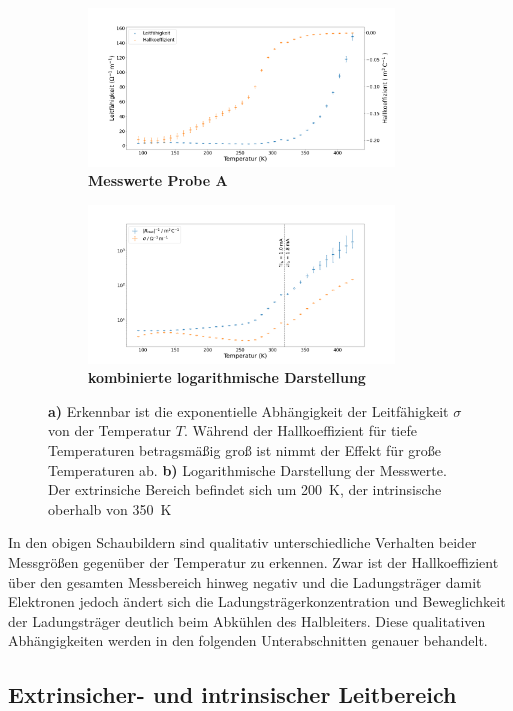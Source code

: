 \begin{figure}[H]
	\centering
	\begin{subfigure}[h]{0.45\linewidth}
	\includegraphics[height=4.2cm]{./fig/probe_A_measurement.png}
	\caption{\textbf{Messwerte Probe A}\label{fig:measurement_A}}
	\end{subfigure}
	\hfill
	\begin{subfigure}[h]{0.45\linewidth}
	\includegraphics[height=4.2cm]{./fig/probe_A_combined_plot.png}
	\caption{\textbf{kombinierte logarithmische Darstellung}
\label{fig:logarithmic_A}}
	\end{subfigure}
	\caption*{\textbf{a)} Erkennbar ist die exponentielle Abhängigkeit der 
Leitfähigkeit $\sigma$ von der Temperatur $T$. Während der Hallkoeffizient für tiefe
Temperaturen betragsmäßig groß ist nimmt der Effekt für große Temperaturen ab. 
\textbf{b)} Logarithmische Darstellung der Messwerte. Der extrinsiche Bereich 
befindet sich um \SI{200}{\kelvin}, der intrinsische oberhalb von \SI{350}{\kelvin} 
\label{measurements_A}}
\end{figure}

In den obigen Schaubildern sind qualitativ unterschiedliche Verhalten beider 
Messgrößen gegenüber der Temperatur zu erkennen. Zwar ist der Hallkoeffizient über
den gesamten Messbereich hinweg negativ und die Ladungsträger damit Elektronen jedoch
ändert sich die Ladungsträgerkonzentration und Beweglichkeit der Ladungsträger 
deutlich beim Abkühlen des Halbleiters. Diese qualitativen Abhängigkeiten werden in 
den folgenden Unterabschnitten genauer behandelt.

\subsection{Extrinsicher- und intrinsischer Leitbereich}
\label{ssec:extrinsic-intrinsic}


